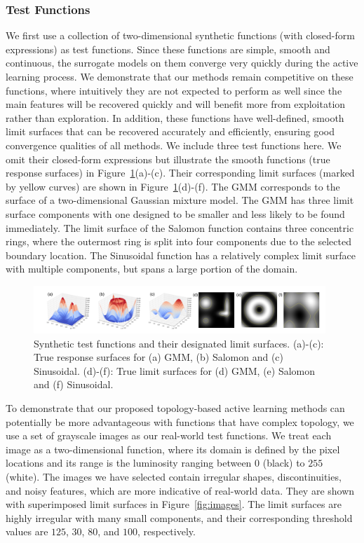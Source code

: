 \subsubsection{Test Functions}
We first use a collection of two-dimensional synthetic functions (with closed-form expressions) as test functions.
%
Since these functions are simple, smooth and continuous, the surrogate models on them converge very quickly during the active learning process.
%
We demonstrate that our methods remain competitive on these functions, where intuitively they are not expected to perform as well since the main features will be recovered quickly and will benefit more from exploitation rather than exploration.
%
In addition, these functions have well-defined, smooth limit surfaces that can be recovered accurately and efficiently, ensuring good convergence qualities of all methods.
%
We include three test functions here.
%
We omit their closed-form expressions but illustrate the smooth functions (true response surfaces) in Figure~\ref{fig:synthetic}(a)-(c).
%
Their corresponding limit surfaces (marked by yellow curves) are shown in Figure~\ref{fig:synthetic}(d)-(f).
%
The GMM corresponds to the surface of a two-dimensional Gaussian mixture model.
%
The GMM has three limit surface components with one designed to be smaller and less likely to be found immediately.
%
The limit surface of the Salomon function contains three concentric rings, where the outermost ring is split into four components due to the selected boundary location.
%
The Sinusoidal function has a relatively complex limit surface with multiple components, but spans a large portion of the domain.

\begin{figure}[!ht]
\centering
\includegraphics[width=0.98\textwidth]{figs/chap5/synthetic}
\caption{Synthetic test functions and their designated limit surfaces.
(a)-(c): True response surfaces for (a) GMM, (b) Salomon and (c) Sinusoidal.
(d)-(f): True limit surfaces for (d) GMM, (e) Salomon and (f) Sinusoidal.}
\label{fig:synthetic}
\end{figure}

To demonstrate that our proposed topology-based active learning methods can potentially be more advantageous with functions that have complex topology, we use a set of grayscale images as our real-world test functions.
%
We treat each image as a two-dimensional function, where its domain is defined by the pixel locations and its range is the luminosity ranging between $0$ (black) to $255$ (white).
%
The images we have selected contain irregular shapes, discontinuities, and noisy features, which are more indicative of real-world data.
%
They are shown with superimposed limit surfaces in Figure~\ref{fig:images}.
%
The limit surfaces are highly irregular with many small components, and their corresponding threshold values are $125$, $30$, $80$, and $100$, respectively.


